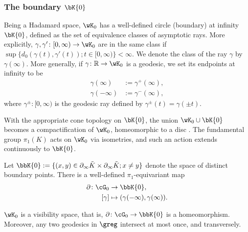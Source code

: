 \documentclass[reqno,11pt]{amsart}
\begin{document}
    
               
\subsubsection{The boundary \(\bK{0}\)}
    \par Being a Hadamard space, \( \wK_0 \) has a well-defined circle (boundary) at infinity \(\bK{0}\), defined as the set of equivalence classes of asymptotic rays.
    More explicitly, \(\gamma, \gamma'\colon [0, \infty) \to \wK_0\) are in the same class if \(\sup\{d_0(\gamma(t), \gamma'(t)); t \in [0, \infty)\} < \infty\).
    We denote the class of the ray \(\gamma\) by \(\gamma(\infty)\).
    More generally, if \(\gamma\colon \mathbb{R} \to \wK_0\) is a geodesic, we set its endpoints at infinity to be
    \begin{align*}
        \gamma(\infty) &:= \gamma^+(\infty),\\
        \gamma(-\infty) &:= \gamma^-(\infty),
    \end{align*}
     where \(\gamma^\pm: [0, \infty)\) is the geodesic ray defined by \( \gamma^\pm(t) = \gamma(\pm t). \)
    \par With the appropriate cone topology on \(\bK{0}\), the union \(\wK_0  \cup \bK{0} \) becomes a compactification of \(\wK_0\), homeomorphic to a disc \cite{bridson2011metric}.
    The fundamental group \(\pi_1(K)\) acts on \(\wK_0\) via isometries, and such an action extends continuously to \(\bK{0}\).
    \par Let \(\bbK{0} := \{ (x,y) \in \partial_\infty \tilde{K} \times \partial_\infty \tilde{K}; x \neq y\}\) denote the space of distinct boundary points. 
    There is a well-defined \(\pi_1\)-equivariant map
    \begin{align*}
        \partial\colon \cG_0 &\to \bbK{0}, \\
                    [\gamma] &\mapsto (\gamma(-\infty), \gamma(\infty)).
    \end{align*}       
    \begin{lemma}\label{lem:wK_is_visibility}
        \(\wK_0\) is a visibility space, that is, \(\partial\colon \cG_0 \to \bbK{0}\) is a homeomorphism.   
        Moreover, any two geodesics in \(\greg\) intersect at most once, and transversely.
    \end{lemma}
\end{document}
